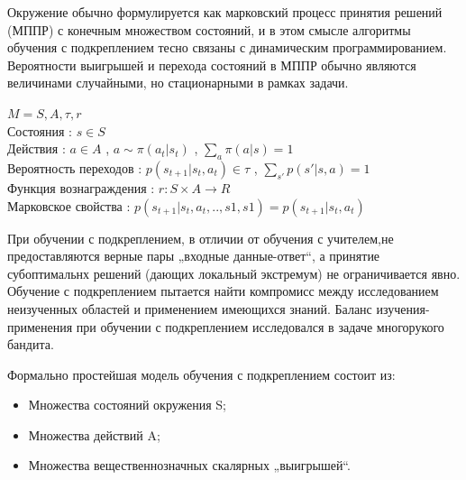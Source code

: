 \documentclass[a4paper,12pt]{article}
\begin{document}
Окружение обычно формулируется как марковский процесс принятия решений (МППР) с конечным множеством состояний, и в этом смысле алгоритмы обучения с подкреплением тесно связаны с динамическим программированием. Вероятности выигрышей и перехода состояний в МППР обычно являются величинами случайными, но стационарными в рамках задачи.
\begin{center}
\end{center}
$M={S,A,\tau,r}$\\
Состояния : $s \in S$ \\
Действия : $a \in A$ , $a \sim \pi(a_t|s_t)$ , $\sum_{a}\pi(a|s)=1$\\
Вероятность переходов : $p(s_{t+1}|s_t,a_t)\in \tau $ , $\sum_{s'}p(s'|s,a)=1$\\
Функция вознаграждения : $ r : S \times A \to R $ \\
Марковское свойства : $p(s_{t+1}|s_t,a_t,..,s1,s1)=p(s_{t+1}|s_t,a_t)$

При обучении с подкреплением, в отличии от обучения с учителем,не предоставляются верные пары „входные данные-ответ“, а принятие субоптимальнх решений (дающих локальный экстремум) не ограничивается явно. Обучение с подкреплением пытается найти компромисс между исследованием неизученных областей и применением имеющихся знаний. Баланс изучения-применения при обучении с подкреплением исследовался в задаче многорукого бандита.

Формально простейшая модель обучения с подкреплением состоит из:
\begin{itemize}
    \item Множества состояний окружения S;
    \item Множества действий A;
    \item Множества вещественнозначных скалярных „выигрышей“. 
\end{itemize}
\end{document}
